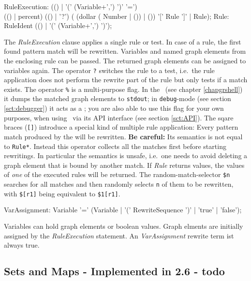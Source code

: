 \begin{rail}    
  RuleExecution: (() | '(' (Variable+',') ')' '=') \\ (() | percent) (() | '?') ( (dollar ( Number | ()) | ()) '[' Rule ']' | Rule);   
  Rule: RuleIdent (() | '(' (Variable+',') ')');
\end{rail}  
The \emph{RuleExecution} clause applies a single rule or test.
In case of a rule, the first found pattern match will be rewritten.
Variables and named graph elements from the enclosing rule can be passed.
The returned graph elements can be assigned to variables again.
The operator \texttt{?} switches the rule to a test, i.e.\ the rule application does not perform the rewrite part of the rule but only tests if a match exists.
The operator \texttt{\%} is a multi-purpose flag. In the \GrShell\ (see chapter \ref{chapgrshell}) it dumps the matched graph elements to \texttt{stdout}; in \texttt{debug}-mode (see section \ref{sct:debugger}) it acts as a ; you are also able to use this flag for your own purposes, when using \GrG\ via its API interface (see section \ref{sct:API}).
The sqare braces (\texttt{[]}) introduce a special kind of multiple rule application: Every pattern match produced by the will be rewritten. \textbf{Be careful:} Its semantics is not equal to \texttt{Rule*}. Instead this operator collects all the matches first before starting rewritings. In particular the semantics is unsafe, i.e.\ one needs to avoid deleting a graph element that is bound by another match. If \emph{Rule} returns values, the values of \emph{one} of the executed rules will be returned.
The random-match-selector \texttt{\$n} searches for all matches and then randomly selects \texttt{n} of them to be rewritten, with \texttt{\$[r1]} being equivalent to \texttt{\$1[r1]}.

\begin{rail}
  VarAssignment: Variable '=' (Variable | 
    '(' RewriteSequence ')' | 
    'true' | 
    'false');
\end{rail}\makeatother
Variables can hold graph elements or boolean values.
Graph elments are initially assigned by the \emph{RuleExecution} statement.
An \emph{VarAssignment} rewrite term ist always true.

\subsection*{Sets and Maps - Implemented in 2.6 - todo}

